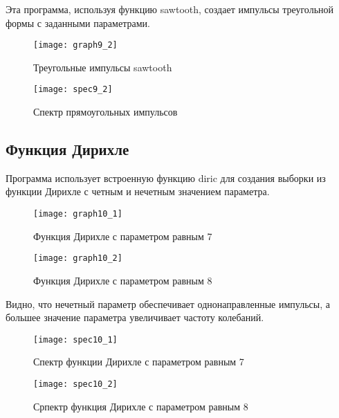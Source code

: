
\parindent=1cm
Эта программа, используя функцию sawtooth, создает импульсы треугольной формы с заданными параметрами.

\begin{figure}[H]
	\begin{center}
		\texttt{[image: graph9\_2]}
		\caption{Треугольные импульсы sawtooth} 
		\label{pic:graph9_2} %
	\end{center}
\end{figure}
\begin{figure}[H]
	\begin{center}
		\texttt{[image: spec9\_2]}
		\caption{Спектр прямоугольных импульсов} 
		\label{pic:spec9_2} %
	\end{center}
\end{figure}

\subsection{Функция Дирихле}


\parindent=1cm
Программа использует встроенную функцию diric для создания выборки из функции Дирихле с четным и нечетным значением параметра.

\begin{figure}[H]
	\begin{center}
		\texttt{[image: graph10\_1]}
		\caption{Функция Дирихле с параметром равным 7} 
		\label{pic:graph10_1} %
	\end{center}
\end{figure}
\begin{figure}[H]
	\begin{center}
		\texttt{[image: graph10\_2]}
		\caption{Функция Дирихле с параметром равным 8} 
		\label{pic:graph10_2} %
	\end{center}
\end{figure}
Видно, что нечетный параметр обеспечивает однонаправленные импульсы, а большее значение параметра увеличивает частоту колебаний.

\begin{figure}[H]
	\begin{center}
		\texttt{[image: spec10\_1]}
		\caption{Спектр функции Дирихле с параметром равным 7} 
		\label{pic:spec10_1} %
	\end{center}
\end{figure}
\begin{figure}[H]
	\begin{center}
		\texttt{[image: spec10\_2]}
		\caption{Српектр функция Дирихле с параметром равным 8} 
		\label{pic:spec10_2} %
	\end{center}
\end{figure}

